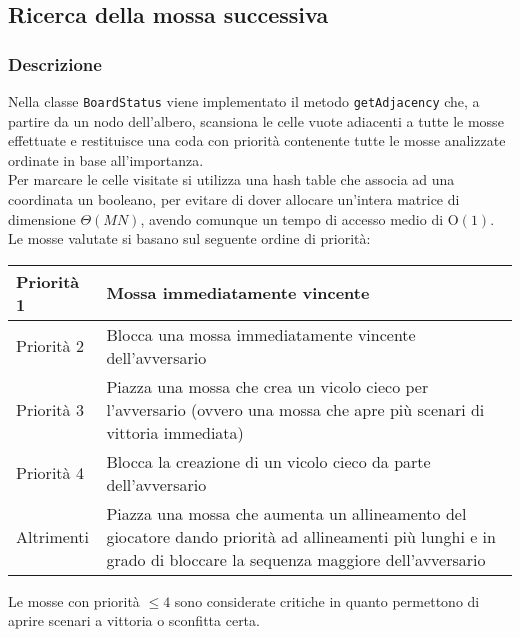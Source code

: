 \documentclass[11pt]{article}
\begin{document}
\subsection*{Ricerca della mossa successiva}
\subsubsection*{Descrizione}
Nella classe \texttt{BoardStatus} viene implementato il metodo \texttt{getAdjacency} che, a partire da un nodo dell'albero, scansiona le celle vuote adiacenti a tutte le mosse effettuate e restituisce una coda con priorità contenente tutte le mosse analizzate ordinate in base all'importanza.\\
Per marcare le celle visitate si utilizza una hash table che associa ad una coordinata un booleano, per evitare di dover allocare un'intera matrice di dimensione $\Theta(MN)$, avendo comunque un tempo di accesso medio di O$(1)$.\\
Le mosse valutate si basano sul seguente ordine di priorità:
\begin{table}[H]	%
\centering			%
\def\arraystretch{1.5}
\begin{tabular}{|l|p{3in}|}	%
\hline	%
Priorità 1 & Mossa immediatamente vincente \\ \hline
Priorità 2 & Blocca una mossa immediatamente vincente dell'avversario \\ \hline
Priorità 3 & Piazza una mossa che crea un vicolo cieco per l'avversario (ovvero una mossa che apre più scenari di vittoria immediata) \\ \hline
Priorità 4 & Blocca la creazione di un vicolo cieco da parte dell'avversario \\ \hline
Altrimenti & Piazza una mossa che aumenta un allineamento del giocatore dando priorità ad allineamenti più lunghi e in grado di bloccare la sequenza maggiore dell'avversario \\ \hline
\end{tabular}
\end{table}
$ $\\
Le mosse con priorità $\leq 4$ sono considerate critiche in quanto permettono di aprire scenari a vittoria o sconfitta certa.
\end{document}
